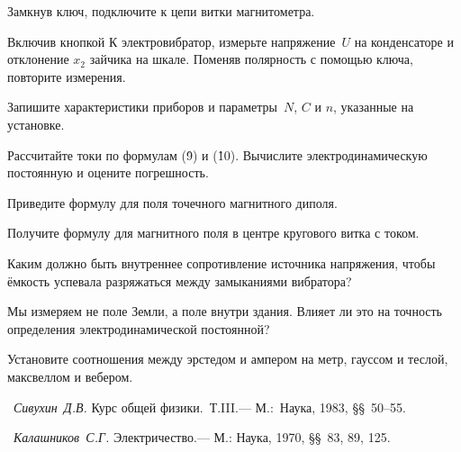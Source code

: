 \n Замкнув ключ, подключите к цепи витки магнитометра.

\n Включив кнопкой К электровибратор, измерьте напряжение~$U$ на конденсаторе и отклонение $x_2$ зайчика на шкале.
Поменяв полярность с помощью ключа, повторите измерения.

\n Запишите характеристики приборов и параметры~$N$, $C$ и $n$, указанные на установке.

\n Рассчитайте токи по формулам (\r9) и (\r{10}). Вычислите электродинамическую постоянную и оцените погрешность.

{\small
	
	\kv%
	
	\n Приведите формулу для поля точечного магнитного диполя.
	
	\n Получите формулу для магнитного поля в центре кругового витка с током.
	
	\n Каким должно быть внутреннее сопротивление источника напряжения, чтобы ёмкость успевала разряжаться между замыканиями
	вибратора?
	
	\n Мы измеряем не поле Земли, а поле внутри здания. Влияет ли это на точность определения электродинамической постоянной?
	
	\n Установите соотношения между эрстедом и ампером на метр, гауссом и теслой, максвеллом и вебером.
	
	\lit
	
	\n~\emph{Сивухин~Д.В.} Курс общей физики.~Т.III.--- М.:~Наука, 1983, \S\S~50--55.
	
	\n~\emph{Калашников~С.Г.} Электричество.--- М.: Наука, 1970, \S\S~83, 89, 125.
	
}
